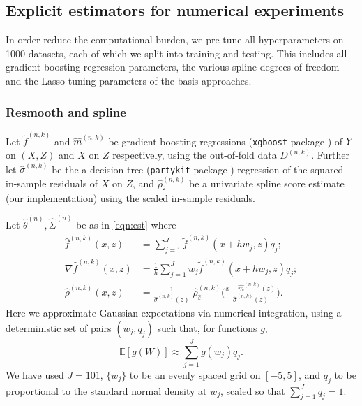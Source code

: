\documentclass[aos]{imsart}
\newcommand{\E}{\mathbb{E}}
\begin{document}
	
	
	\subsection{Explicit estimators for numerical experiments}
	\label{sect:simulationimplementation}
	
	In order reduce the computational burden, we pre-tune all hyperparameters on 1000 datasets, each of which we split into training and testing. This includes all gradient boosting regression parameters, the various spline degrees of freedom and the Lasso tuning parameters of the basis approaches.
	
	\subsubsection{Resmooth and spline}
	\label{sect:methodus}
	Let $\tilde f^{(n,k)}$ and $\hat m^{(n,k)}$ be gradient boosting regressions (\texttt{xgboost} package \citep{xgboost}) of $Y$ on $(X,Z)$ and $X$ on $Z$ respectively, using the out-of-fold data $D^{(n,k)}$. Further let $\hat\sigma^{(n,k)}$ be the a decision tree (\texttt{partykit} package \citep{partykit}) regression of the squared in-sample residuals of $X$ on $Z$, and $\hat \rho_{\hat\varepsilon}^{(n,k)}$ be a univariate spline score estimate (our implementation) using the scaled in-sample residuals.
	
	Let $\hat \theta^{(n)}, \hat\Sigma^{(n)}$ be as in \eqref{eqn:est} where \begin{align}
		\hat f^{(n,k)}(x,z) &= \sum_{j=1}^J\tilde f^{(n,k)}(x+hw_j,z)q_j; \label{eqn:resmooth}\\
		\nabla \hat f^{(n,k)}(x,z) &= \frac1h \sum_{j=1}^J w_j\tilde f^{(n,k)}(x+hw_j,z)q_j ; \label{eqn:resmoothderiv}\\
		\hat \rho^{(n,k)}(x,z) &= \frac{1}{\hat \sigma^{(n,k)}(z)}\; \hat \rho_{\hat\varepsilon}^{(n,k)}\bigg(\frac{x-\hat m^{(n,k)}(z)}{\hat\sigma^{(n,k)}(z)}\bigg). \label{eqn:splinescore}
	\end{align}
	Here we approximate Gaussian expectations via numerical integration, using a deterministic set of pairs $(w_j, q_j)$ such that, for functions $g$, \begin{equation*}
		\E [g(W)] \approx \sum_{j=1}^J g(w_j)q_j.
	\end{equation*}
	We have used $J=101$, $\{w_j\}$ to be an evenly spaced grid on $[-5,5]$, and $q_j$ to be proportional to the standard normal density at $w_j$, scaled so that $\sum_{j=1}^J q_j=1$.
	
\end{document}
